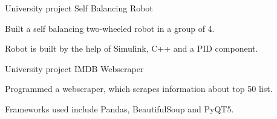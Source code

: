 
\begin{cventries}
  \cventry
    {University project} %
    {Self Balancing Robot} %
    {} %
    {} %
    {
      \begin{cvitems} %
      	\item {Built a self balancing two-wheeled robot in a group of 4.}
		    \item {Robot is built by the help of Simulink, C++ and a PID component.}
      \end{cvitems}
    }

  \cventry
    {University project} %
    {IMDB Webscraper} %
    {} %
    {} %
    {
      \begin{cvitems} %
      	\item {Programmed a webscraper, which scrapes information about top 50 list.}
		    \item {Frameworks used include Pandas, BeautifulSoup and PyQT5.}
      \end{cvitems}
    }
\end{cventries}